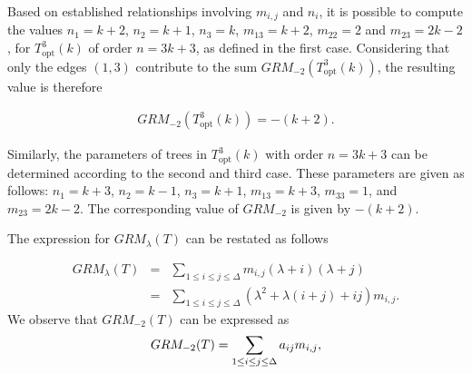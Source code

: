 \documentclass[preprint,12pt]{elsarticle}
\begin{document}

Based on established relationships involving $m_{i,j}$ and $n_i$, it is possible to compute the values
$n_1=k+2$, $n_2=k+1$, $n_{3}=k$, $m_{13}=k+2$, $m_{22}=2$ and $m_{23}=2k-2$, for $T_{\text{opt}}^3(k)$ of order $n=3k+3$, as defined in the first case.
Considering that only the edges $(1,3)$ contribute to the sum $GRM_{-2}(T_{\text{opt}}^3(k))$, the resulting value is therefore

\begin{eqnarray}
\label{Zagreb_opt_3}
GRM_{-2}(T_{\text{opt}}^3(k))=-(k+2).
\end{eqnarray}

Similarly, the parameters of trees in $T_{\text{opt}}^3(k)$ with order $n=3k+3$ can be determined according to the second and third case. These parameters are given as follows: $n_1=k+3$, $n_2=k-1$, $n_3=k+1$, $m_{13}=k+3$, $m_{33}=1$, and $m_{23}=2k-2$. The corresponding value of $GRM_{-2}$ is given by $-(k+2)$.


\bigskip

The expression for $GRM_{\lambda}(T)$ can be restated as follows

\begin{eqnarray*}
GRM_{\lambda}(T) &=& \sum_{1\leq i\leq j\leq \Delta} m_{i,j} (\lambda+i)(\lambda+j)\\
  &=& \sum_{1\leq i\leq j\leq \Delta}(\lambda^2+\lambda (i+j)+ij) m_{i,j}.
\end{eqnarray*}
We observe that $GRM_{-2}(T)$ can be expressed as 
\begin{eqnarray}
\label{GRM_{-2}(T)}
GRM_{-2}(T)=\sum_{1\leq i\leq j\leq \Delta}a_{ij} m_{i,j},
\end{eqnarray}
\end{document}
